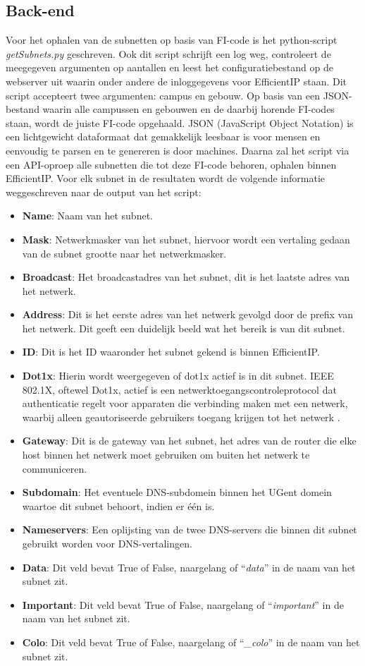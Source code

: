 \subsection{Back-end}
Voor het ophalen van de subnetten op basis van FI-code is het python-script \\\textit{getSubnets.py} geschreven. Ook dit script schrijft een log weg, controleert de meegegeven argumenten op aantallen en leest het configuratiebestand op de webserver uit waarin onder andere de inloggegevens voor EfficientIP staan. Dit script accepteert twee argumenten: campus en gebouw. Op basis van een JSON-bestand waarin alle campussen en gebouwen en de daarbij horende FI-codes staan, wordt de juiste FI-code opgehaald. JSON (JavaScript Object Notation) is een lichtgewicht dataformaat dat gemakkelijk leesbaar is voor mensen en eenvoudig te parsen en te genereren is door machines. Daarna zal het script via een API-oproep alle subnetten die tot deze FI-code behoren, ophalen binnen EfficientIP. Voor elk subnet in de resultaten wordt de volgende informatie weggeschreven naar de output van het script:
\begin{itemize}
    \item \textbf{Name}: Naam van het subnet.
    \item \textbf{Mask}: Netwerkmasker van het subnet, hiervoor wordt een vertaling gedaan van de subnet grootte naar het netwerkmasker.
    \item \textbf{Broadcast}: Het broadcastadres van het subnet, dit is het laatste adres van het netwerk.
    \item \textbf{Address}: Dit is het eerste adres van het netwerk gevolgd door de prefix van het netwerk. Dit geeft een duidelijk beeld wat het bereik is van dit subnet.
    \item \textbf{ID}: Dit is het ID waaronder het subnet gekend is binnen EfficientIP.
    \item \textbf{Dot1x}: Hierin wordt weergegeven of dot1x actief is in dit subnet. IEEE 802.1X, oftewel Dot1x, actief is een netwerktoegangscontroleprotocol dat authenticatie regelt voor apparaten die verbinding maken met een netwerk, waarbij alleen geautoriseerde gebruikers toegang krijgen tot het netwerk \autocite{Brown2006}.
    \item \textbf{Gateway}: Dit is de gateway van het subnet, het adres van de router die elke host binnen het netwerk moet gebruiken om buiten het netwerk te communiceren.
    \item \textbf{Subdomain}: Het eventuele DNS-subdomein binnen het UGent domein waartoe dit subnet behoort, indien er één is.
    \item \textbf{Nameservers}: Een oplijsting van de twee DNS-servers die binnen dit subnet gebruikt worden voor DNS-vertalingen.
    \item \textbf{Data}: Dit veld bevat True of False, naargelang of “\textit{data}” in de naam van het subnet zit.
    \item \textbf{Important}: Dit veld bevat True of False, naargelang of “\textit{important}” in de naam van het subnet zit.
    \item \textbf{Colo}: Dit veld bevat True of False, naargelang of “\textit{\_colo}” in de naam van het subnet zit.
\end{itemize}
